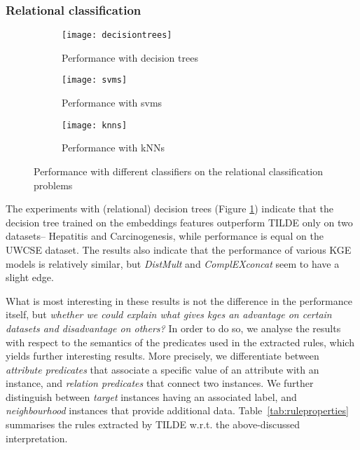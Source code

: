 \subsubsection{Relational classification}


\begin{figure}[!ht]
	\centering
	\begin{subfigure}{0.98\linewidth}
		\centering
		\texttt{[image: decisiontrees]}
		\caption{Performance with decision trees\label{fig:dtres}}
	\end{subfigure}

	\begin{subfigure}{0.98\linewidth}
		\centering
		\texttt{[image: svms]}

		\caption{Performance with svms\label{fig:svms}}
	\end{subfigure}

	\begin{subfigure}{0.98\linewidth}
		\centering
		\texttt{[image: knns]}

		\caption{Performance with kNNs\label{fig:knns}}
	\end{subfigure}

	\caption{Performance with different classifiers on the relational classification problems}
\end{figure}








The experiments with (relational) decision trees (Figure \ref{fig:dtres}) indicate that the decision tree trained on the embeddings features outperform TILDE only on two datasets-- Hepatitis and Carcinogenesis, while performance is equal on the UWCSE dataset.
The results also indicate that the performance of various KGE models is relatively similar, but \textit{DistMult} and \textit{ComplEXconcat} seem to have a slight edge.



What is most interesting in these results is not the difference in the performance itself, but \textit{whether we could explain what gives \gls{kge}s  an advantage on certain datasets and disadvantage on others?}
In order to do so, we analyse the results with respect to the semantics of the predicates used in the extracted rules, which yields further interesting results.
More precisely, we differentiate between \textit{attribute predicates} that associate a specific value of an attribute with an instance, and \textit{relation predicates} that connect two instances.
We further distinguish between \textit{target} instances having an associated label, and \textit{neighbourhood} instances that provide additional data.
Table~\ref{tab:ruleproperties} summarises the rules extracted by TILDE w.r.t. the above-discussed interpretation.



